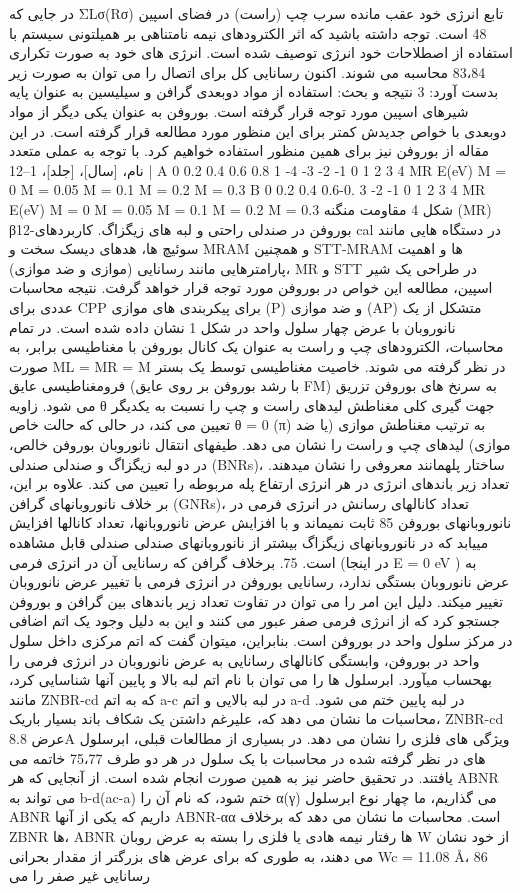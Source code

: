 در جایی که ΣLσ(Rσ) تابع انرژی خود عقب مانده سرب چپ (راست) در فضای اسپین 48 است. توجه داشته باشید که اثر الکترودهای نیمه نامتناهی بر همیلتونی سیستم با استفاده از اصطلاحات خود انرژی توصیف شده است. انرژی های خود به صورت تکراری 83،84 محاسبه می شوند. اکنون رسانایی کل برای اتصال را می توان به صورت زیر بدست آورد:
3 نتیجه و بحث: استفاده از مواد دوبعدی گرافن و سیلیسین به عنوان پایه شیرهای اسپین مورد توجه قرار گرفته است. بوروفن به عنوان یکی دیگر از مواد دوبعدی با خواص جدیدش کمتر برای این منظور مورد مطالعه قرار گرفته است. در این مقاله از بوروفن نیز برای همین منظور استفاده خواهیم کرد. با توجه به عملی متعدد نام، [سال]، [جلد]، 1–12 | A 0 0.2 0.4 0.6 0.8 1 -4 -3 -2 -1 0 1 2 3 4 MR E(eV) M = 0 M = 0.05 M = 0.1 M = 0.2 M = 0.3 B 0 0.2 0.4 0.6-0. 3 -2 -1 0 1 2 3 4 MR E(eV) M = 0 M = 0.05 M = 0.1 M = 0.2 M = 0.3 شکل 4 مقاومت منگنه (MR) β12-بوروفن در صندلی راحتی و لبه های زیگزاگ. کاربردهای cal در دستگاه هایی مانند سوئیچ ها، هدهای دیسک سخت و MRAM و همچنین STT-MRAM ها و اهمیت پارامترهایی مانند رسانایی (موازی و ضد موازی)، MR و STT در طراحی یک شیر اسپین، مطالعه این خواص در بوروفن مورد توجه قرار خواهد گرفت. نتیجه محاسبات عددی برای CPP برای پیکربندی های موازی (P) و ضد موازی (AP) متشکل از یک نانوروبان با عرض چهار سلول واحد در شکل 1 نشان داده شده است. در تمام محاسبات، الکترودهای چپ و راست به عنوان یک کانال بوروفن با مغناطیسی برابر، به صورت ML = MR = M در نظر گرفته می شوند. خاصیت مغناطیسی توسط یک بستر فرومغناطیسی عایق (با رشد بوروفن بر روی عایق FM) به سرنخ های بوروفن تزریق می شود. زاویه θ جهت گیری کلی مغناطش لیدهای راست و چپ را نسبت به یکدیگر تعیین می کند، در حالی که حالت خاص θ = 0 (π) به ترتیب مغناطش موازی (یا ضد موازی) لیدهای چپ و راست را نشان می دهد. طیفهای انتقال نانوروبان بوروفن خالص، در دو لبه زیگزاگ و صندلی صندلی (BNRs)، ساختار پلهمانند معروفی را نشان میدهند. تعداد زیر باندهای انرژی در هر انرژی ارتفاع پله مربوطه را تعیین می کند. علاوه بر این، بر خلاف نانوروبانهای گرافن (GNRs)، تعداد کانالهای رسانش در انرژی فرمی در نانوروبانهای بوروفن 85 ثابت نمیماند و با افزایش عرض نانوروبانها، تعداد کانالها افزایش مییابد که در نانوروبانهای زیگزاگ بیشتر از نانوروبانهای صندلی صندلی قابل مشاهده است. 75. برخلاف گرافن که رسانایی آن در انرژی فرمی (در اینجا E = 0 eV ) به عرض نانوروبان بستگی ندارد، رسانایی بوروفن در انرژی فرمی با تغییر عرض نانوروبان تغییر میکند. دلیل این امر را می توان در تفاوت تعداد زیر باندهای بین گرافن و بوروفن جستجو کرد که از انرژی فرمی صفر عبور می کنند و این به دلیل وجود یک اتم اضافی در مرکز سلول واحد در بوروفن است. بنابراین، میتوان گفت که اتم مرکزی داخل سلول واحد در بوروفن، وابستگی کانالهای رسانایی به عرض نانوروبان در انرژی فرمی را بهحساب میآورد. ابرسلول ها را می توان با نام اتم لبه بالا و پایین آنها شناسایی کرد، مانند ZNBR-cd که به اتم a-c در لبه بالایی و اتم a-d در لبه پایین ختم می شود. محاسبات ما نشان می دهد که، علیرغم داشتن یک شکاف باند بسیار باریک، ZNBR-cd عرض 8.8A ویژگی های فلزی را نشان می دهد. در بسیاری از مطالعات قبلی، ابرسلول های در نظر گرفته شده در محاسبات با یک سلول در هر دو طرف 75،77 خاتمه می یافتند. در تحقیق حاضر نیز به همین صورت انجام شده است. از آنجایی که هر ABNR می تواند به b-d(ac-a) ختم شود، که نام آن را α(γ) می گذاریم، ما چهار نوع ابرسلول ABNR داریم که یکی از آنها ABNR-αα است. محاسبات ما نشان می دهد که برخلاف ZBNR ها، ABNR ها رفتار نیمه هادی یا فلزی را بسته به عرض روبان W از خود نشان می دهند، به طوری که برای عرض های بزرگتر از مقدار بحرانی Wc = 11.08 Å، 86 رسانایی غیر صفر را می 
